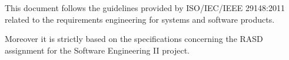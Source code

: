 This document follows the guidelines provided by ISO/IEC/IEEE 29148:2011\cite{ieee-29148} related to the requirements engineering for systems and software products.

Moreover it is strictly based on the specifications concerning the RASD assignment\cite{se-assignments} for the Software Engineering II project.